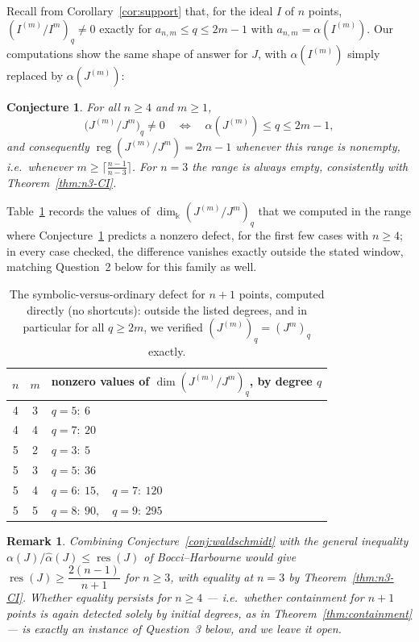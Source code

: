 \documentclass[11pt]{article}
\newtheorem{conjecture}[theorem]{Conjecture}
\newtheorem{remark}[theorem]{Remark}
\newcommand{\walpha}{\widehat{\alpha}}
\begin{document}
Recall from Corollary~\ref{cor:support} that, for the ideal \(I\) of
\(n\) points, \((I^{(m)}/I^m)_q\ne0\) exactly for
\(a_{n,m}\le q\le2m-1\) with \(a_{n,m}=\alpha(I^{(m)})\).  Our
computations show the same shape of answer for \(J\), with
\(\alpha(I^{(m)})\) simply replaced by \(\alpha(J^{(m)})\):

\begin{conjecture}\label{conj:support}
For all \(n\ge4\) and \(m\ge1\),
\[
 \bigl(J^{(m)}/J^m\bigr)_q\ne0
 \quad\Longleftrightarrow\quad
 \alpha(J^{(m)})\le q\le2m-1,
\]
and consequently \(\operatorname{reg}(J^{(m)}/J^m)=2m-1\) whenever this
range is nonempty, i.e.\ whenever \(m\ge\bigl\lceil\frac{n-1}{n-3}\bigr\rceil\).
For \(n=3\) the range is always empty, consistently with
Theorem~\ref{thm:n3-CI}.
\end{conjecture}

Table~\ref{tab:defect} records the values of
\(\dim_\Bbbk(J^{(m)}/J^m)_q\) that we computed in the range where
Conjecture~\ref{conj:support} predicts a nonzero defect, for the first
few cases with \(n\ge4\); in every case checked, the difference
vanishes exactly outside the stated window, matching
Question~2 below for this family as well.

\begin{table}[h]
\centering
\begin{tabular}{c|c|l}
\(n\)&\(m\)&nonzero values of \(\dim(J^{(m)}/J^m)_q\), by degree \(q\)\\\hline
4&3&\(q=5:\ 6\)\\
4&4&\(q=7:\ 20\)\\
5&2&\(q=3:\ 5\)\\
5&3&\(q=5:\ 36\)\\
5&4&\(q=6:\ 15,\quad q=7:\ 120\)\\
5&5&\(q=8:\ 90,\quad q=9:\ 295\)
\end{tabular}
\caption{The symbolic-versus-ordinary defect for \(n+1\) points,
computed directly (no shortcuts): outside the listed degrees, and in
particular for all \(q\ge2m\), we verified
\((J^{(m)})_q=(J^m)_q\) exactly.}
\label{tab:defect}
\end{table}

\begin{remark}
Combining Conjecture~\ref{conj:waldschmidt} with the general
inequality \(\alpha(J)/\walpha(J)\le\operatorname{res}(J)\) of
Bocci--Harbourne would give
\(\operatorname{res}(J)\ge\dfrac{2(n-1)}{n+1}\) for \(n\ge3\), with
equality at \(n=3\) by Theorem~\ref{thm:n3-CI}.  Whether equality
persists for \(n\ge4\) --- i.e.\ whether containment for \(n+1\)
points is again detected solely by initial degrees, as in
Theorem~\ref{thm:containment} --- is exactly an instance of
Question~3 below, and we leave it open.
\end{remark}
\end{document}
